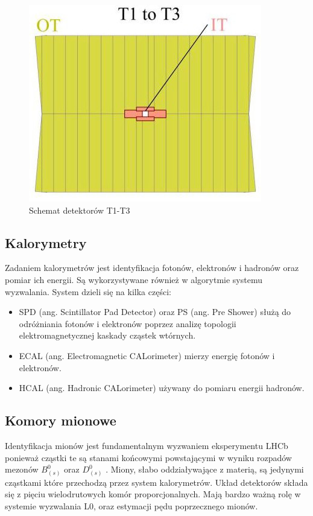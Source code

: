 \begin{figure}[th] 
  \centering
  \includegraphics[scale=0.5]{rozdzial2/OT-Module-design.jpg}
  \caption{Schemat detektorów T1-T3\cite{public}}
  \label{fig:OTLayput}
\end{figure}

\subsection{Kalorymetry}
Zadaniem  kalorymetrów jest identyfikacja fotonów, elektronów i hadronów oraz pomiar ich energii. Są wykorzystywane również w algorytmie systemu wyzwalania. System dzieli się na kilka części:
\begin{itemize}
\item SPD (ang. Scintillator Pad Detector) oraz PS (ang. Pre Shower) służą do odróżniania fotonów i elektronów poprzez analizę topologii elektromagnetycznej kaskady cząstek wtórnych.
\item ECAL (ang. Electromagnetic CALorimeter) mierzy energię fotonów i elektronów. 
\item HCAL (ang. Hadronic CALorimeter) używany do pomiaru energii hadronów.
\end{itemize}
\subsection{Komory mionowe}
Identyfikacja mionów jest fundamentalnym wyzwaniem eksperymentu LHCb ponieważ cząstki te są stanami końcowymi powstającymi w wyniku rozpadów mezonów $B_{(s)}^0$ oraz $D_{(s)}^0$ . Miony, słabo oddziaływające z materią, są jedynymi cząstkami które przechodzą przez system kalorymetrów. Układ detektorów składa się z pięciu wielodrutowych komór proporcjonalnych. Mają bardzo ważną rolę w systemie wyzwalania L0, oraz estymacji pędu poprzecznego mionów.
